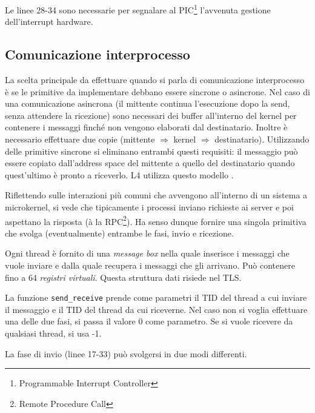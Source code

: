 \documentclass[12pt,a4paper]{report}
\begin{document}
			Le linee 28-34 sono necessarie per segnalare al PIC\footnote{Programmable Interrupt Controller} l'avvenuta
			gestione dell'interrupt hardware.
			
		\subsection{Comunicazione interprocesso}
			La scelta principale da effettuare quando si parla di comunicazione interprocesso è se le primitive
			da implementare debbano essere sincrone o asincrone.
			Nel caso di una comunicazione asincrona (il mittente continua l'esecuzione dopo la send, senza attendere
			la ricezione) sono necessari dei buffer all'interno del kernel per contenere i messaggi finché non vengono elaborati dal destinatario.
			Inoltre è necessario effettuare due copie (mittente $\Rightarrow$ kernel $\Rightarrow$ destinatario).
			Utilizzando delle primitive sincrone si eliminano entrambi questi requisiti: il messaggio può essere copiato
			dall'address space del mittente a quello del destinatario quando quest'ultimo è pronto a riceverlo.
			L4 utilizza questo modello \cite{Neider}.
			
			Riflettendo sulle interazioni più comuni che avvengono all'interno di un sistema a microkernel, si vede
			che tipicamente i processi inviano richieste ai server e poi aspettano la risposta (à la RPC\footnote{Remote Procedure Call}).
			Ha senso dunque fornire una singola primitiva che svolga (eventualmente) entrambe le fasi, invio e ricezione.
					
			
			
			Ogni thread è fornito di una \emph{message box} nella quale inserisce i messaggi che vuole
			inviare e dalla quale recupera i messaggi che gli arrivano. Può contenere fino a 64 \emph{registri
			virtuali}. Questa struttura dati risiede nel TLS.
					
			
			
			La funzione \texttt{send\_receive} prende come parametri il TID del thread a cui inviare il messaggio
			e il TID del thread da cui riceverne. Nel caso non si voglia effettuare una delle due fasi, si
			passa il valore 0 come parametro. Se si vuole ricevere da qualsiasi thread, si usa -1.
			
			La fase di invio (linee 17-33) può svolgersi in due modi differenti.
			
\end{document}
